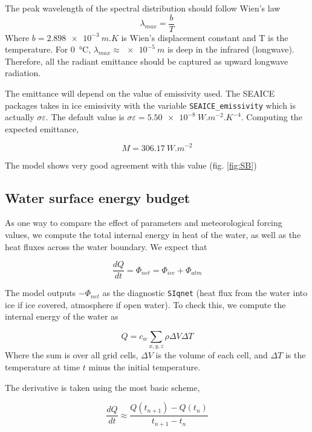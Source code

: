 \documentclass[11pt]{article}
\begin{document}
The peak wavelength of the spectral distribution should follow Wien's law
\begin{equation}
\lambda_{max} = \frac{b}{T}
\end{equation}
Where $b = \SI{2.898e-3}{m.K}$ is Wien's displacement constant and T is the temperature. For \SI{0}{\celsius}, $\lambda_{max} \approx \SI{e-5}{m}$ is deep in the infrared (longwave). Therefore, all the radiant emittance should be captured as upward longwave radiation.

The emittance will depend on the value of emissivity used. The SEAICE packages takes in ice emissivity with the variable \verb|SEAICE_emissivity| which is actually $\sigma \varepsilon$. The default value is $\sigma \varepsilon = \SI{5.50e-8}{ W.m^{-2}.K^{-4}}$.  Computing the expected emittance, 

\begin{equation*}
M = \SI{306.17}{W.m^{-2}}
\end{equation*}

The model shows very good agreement with this value (fig. \ref{fig:SB})

\subsection{Water surface energy budget}
As one way to compare the effect of parameters and meteorological forcing values, we compute the total internal energy in heat of the water, as well as the heat fluxes across the water boundary. We expect that

\begin{equation}
\frac{d Q}{d t} = \Phi_{net} = \Phi_{ice} + \Phi_{atm}
\end{equation}

The model outputs $-\Phi_{net}$ as the diagnostic \verb|SIqnet| (heat flux from the water into ice if ice covered, atmosphere if open water). To check this, we compute the internal energy of the water as

\begin{equation}
Q = c_w \sum_{x, y, z} \rho \Delta V \Delta T
\end{equation}
Where the sum is over all grid cells, $\Delta V$ is the volume of each cell, and $\Delta T$ is the temperature at time $t$ minus the initial temperature.

The derivative is taken using the most basic scheme,

\begin{equation*}
\frac{d Q}{d t} \approx \frac{Q(t_{n+1}) - Q(t_n)}{t_{n+1} - t_n}
\end{equation*}
\end{document}
